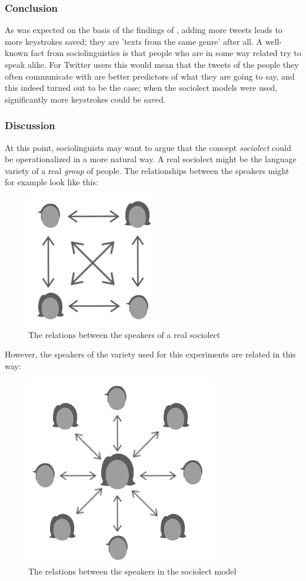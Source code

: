 \documentclass[11pt]{article}
\begin{document}
\subsubsection{Conclusion}
As was expected on the basis of the findings of , adding more tweets leads to more keystrokes saved; they are 'texts from the same genre' after all. A well-known fact from sociolinguistics is that people who are in some way related try to speak alike. For Twitter users this would mean that the tweets of the people they often communicate with are better predictors of what they are going to say, and this indeed turned out to be the case; when the sociolect models were used, significantly more keystrokes could be saved.


\subsubsection{Discussion}
At this point, sociolinguists may want to argue that the concept \emph{sociolect} could be operationalized in a more natural way. A real sociolect might be the language variety of a real \emph{group} of people. The relationships between the speakers might for example look like this:

\begin{figure}[H] \centering
\includegraphics[scale=0.75]{real_network}
\caption{The relations between the speakers of a real sociolect}
\end{figure} 

However, the speakers of the variety used for this experiments are related in this way:

\begin{figure}[H] \centering
\includegraphics[scale=0.75]{sloppy_network}
\caption{The relations between the speakers in the sociolect model}
\end{figure} 
\end{document}
